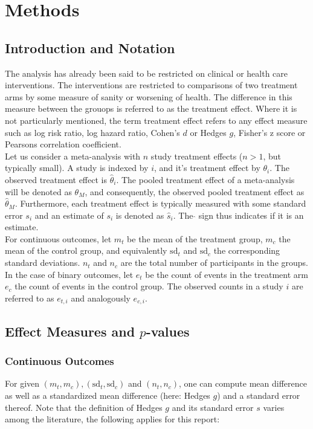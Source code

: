 

\chapter{Methods} 
\section{Introduction and Notation}
The analysis has already been said to be restricted on clinical or health care interventions. The interventions are restricted to comparisons of two treatment arms by some measure of sanity or worsening of health. The difference in this measure between the grouops is referred to as the treatment effect. Where it is not particularly mentioned, the term treatment effect refers to any effect measure such as log risk ratio, log hazard ratio, Cohen's $d$ or Hedges $g$, Fisher's z score or Pearsons correlation coefficient. \\
Let us consider a meta-analysis with $n$ study treatment effects ($n > 1$, but typically small). A study is indexed by $i$, and it's treatment effect by  $\theta_i$. The observed treatment effect is $\hat{\theta}_i$. The pooled treatment effect of a meta-analysis will be denoted as $\theta_M$, and consequently, the observed pooled treatment effect as $\hat{\theta}_M$. Furthermore, each treatment effect is typically measured with some standard error $s_i$ and an estimate of $s_i$ is denoted as $\hat{s}_i$. The $\hat{}$ sign thus indicates if it is an estimate.\\
For continuous outcomes, let $m_t$ be the mean of the treatment group, $m_c$ the mean of the control group, and equivalently $\textrm{sd}_t$ and $\textrm{sd}_c$ the corresponding standard deviations. $n_t$ and $n_c$ are the total number of participants in the groups.
In the case of binary outcomes, let $e_t$ be the count of events in the treatment arm $e_c$ the count of events in the control group. The observed counts in a study $i$ are referred to as $e_{t,i}$ and analogously $e_{c,i}$.

\section{Effect Measures and $p$-values}
\subsection{Continuous Outcomes}
For given $(m_t, m_c), (\textrm{sd}_t, \textrm{sd}_c)$ and $(n_t, n_c)$, one can compute mean difference as well as a standardized mean difference (here: Hedges $g$) and  a standard error thereof. Note that the definition of Hedges $g$ and its standard error $s$ varies among the literature, the following applies for this report:

